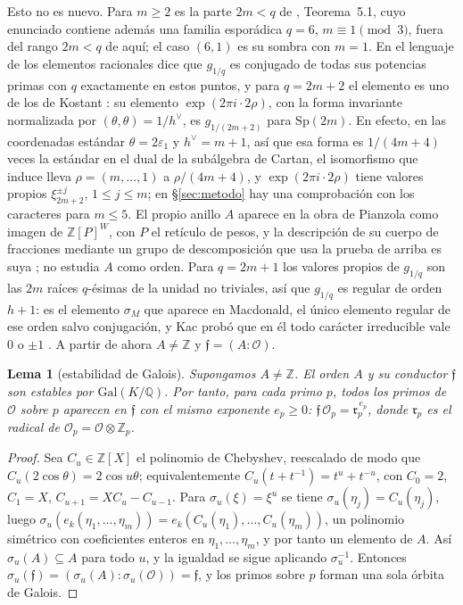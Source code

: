 \documentclass[11pt,a4paper]{article}
\newtheorem{lemma}[theorem]{Lema}
\theoremstyle{definition}
\newcommand{\Sp}{\mathrm{Sp}}
\newcommand{\ZZ}{\mathbb{Z}}
\newcommand{\QQ}{\mathbb{Q}}
\newcommand{\cO}{\mathcal{O}}
\newcommand{\cf}{\mathfrak{f}}
\newcommand{\rad}{\mathfrak{r}}
\begin{document}
\noindent Esto no es nuevo. Para $m\ge2$ es la parte $2m<q$ de \cite{Mar26}, Teorema~5.1, cuyo enunciado contiene
además una familia esporádica $q=6$, $m\equiv1\pmod3$, fuera del rango $2m<q$ de aquí; el caso $(6,1)$ es su sombra
con $m=1$. En el lenguaje de los elementos racionales dice que $g_{1/q}$ es conjugado de todas sus potencias primas
con $q$ exactamente en estos puntos, y para $q=2m+2$ el elemento es uno de los de Kostant \cite[Teor.~3.1]{Kostant76}: su elemento
$\exp(2\pi i\cdot2\rho)$, con la forma invariante normalizada por $(\theta,\theta)=1/h^\vee$, es $g_{1/(2m+2)}$ para
$\Sp(2m)$. En efecto, en las coordenadas estándar $\theta=2\varepsilon_1$ y $h^\vee=m+1$, así que esa forma es
$1/(4m+4)$ veces la estándar en el dual de la subálgebra de Cartan, el isomorfismo que induce lleva
$\rho=(m,\dots,1)$ a $\rho/(4m+4)$, y $\exp(2\pi i\cdot2\rho)$ tiene valores propios $\xi_{2m+2}^{\pm j}$,
$1\le j\le m$; en \S\ref{sec:metodo} hay una comprobación con los caracteres para $m\le5$. El propio anillo $A$
aparece en la obra de Pianzola como imagen de $\ZZ[P]^W$, con $P$ el retículo de pesos, y la descripción de su cuerpo de fracciones mediante un
grupo de descomposición que usa la prueba de arriba es suya \cite[Teor.~1 y Prop.~10]{Pia87}; no estudia $A$ como
orden. Para $q=2m+1$ los
valores propios de $g_{1/q}$ son las $2m$ raíces $q$-ésimas de la unidad no triviales, así que $g_{1/q}$ es regular de
orden $h+1$: es el elemento $\sigma_M$ que aparece en Macdonald, el único elemento regular de ese orden salvo conjugación,
y Kac probó que en él todo carácter irreducible vale $0$ o $\pm1$ \cite[\S\S0--1]{Kac81}. A partir de ahora $A\neq\ZZ$ y
$\cf=(A:\cO)$.

\begin{lemma}[estabilidad de Galois]\label{lem:galois}
Supongamos $A\ne\ZZ$. El orden $A$ y su conductor $\cf$ son estables por $\mathrm{Gal}(K/\QQ)$. Por tanto, para cada primo $p$, todos los
primos de $\cO$ sobre $p$ aparecen en $\cf$ con el mismo exponente $e_p\ge0$: $\cf\,\cO_p=\rad_p^{\,e_p}$, donde
$\rad_p$ es el radical de $\cO_p=\cO\otimes\ZZ_p$.
\end{lemma}

\begin{proof}
Sea $C_u\in\ZZ[X]$ el polinomio de Chebyshev, reescalado de modo que $C_u(2\cos\theta)=2\cos u\theta$; equivalentemente
$C_u(t+t^{-1})=t^u+t^{-u}$, con $C_0=2$, $C_1=X$, $C_{u+1}=XC_u-C_{u-1}$. Para $\sigma_u(\xi)=\xi^u$ se tiene $\sigma_u(\eta_j)=C_u(\eta_j)$, luego
$\sigma_u(e_k(\eta_1,\dots,\eta_m))=e_k(C_u(\eta_1),\dots,C_u(\eta_m))$, un polinomio simétrico con coeficientes
enteros en $\eta_1,\dots,\eta_m$, y por tanto un elemento de $A$. Así $\sigma_u(A)\subseteq A$ para todo $u$, y la
igualdad se sigue aplicando $\sigma_u^{-1}$. Entonces $\sigma_u(\cf)=(\sigma_u(A):\sigma_u(\cO))=\cf$, y los primos
sobre $p$ forman una sola órbita de Galois.
\end{proof}
\end{document}
